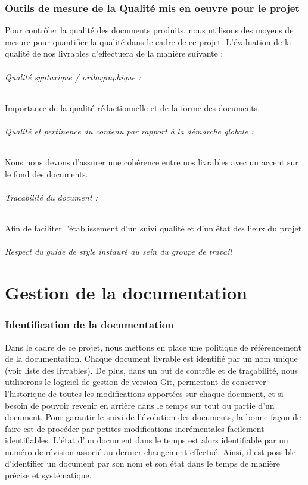 \documentclass[a4paper, 18pt]{article}
\begin{document}
\section{Outils de mesure de la Qualité mis en oeuvre pour le projet}

Pour contrôler la qualité des documents produits, nous utilisons des moyens de mesure pour quantifier la qualité dans le cadre de ce projet. L'évaluation de la qualité de nos livrables d'effectuera de la manière suivante :

\paragraph*{Qualité syntaxique / orthographique :} Importance de la qualité rédactionnelle et de la forme des documents.
\paragraph*{Qualité et pertinence du contenu par rapport à la démarche globale :} Nous nous devons d’assurer une cohérence entre nos livrables avec un accent sur le fond des documents.
\paragraph*{Tracabilité du document :} Afin de faciliter l’établissement d’un suivi qualité et d’un état des lieux du projet.
\paragraph*{Respect du guide de style instauré au sein du groupe de travail}

\part{Gestion de la documentation}

\section{Identification de la documentation}

Dans le cadre de ce projet, nous mettons en place une politique de référencement de la documentation. Chaque document livrable est identifié par un nom unique (voir liste des livrables). De plus, dans un but de contrôle et de traçabilité, nous utiliserons le logiciel de gestion de version Git, permettant de conserver l'historique de toutes les modifications apportées sur chaque document, et si besoin de pouvoir revenir en arrière dans le temps sur tout ou partie d'un document. Pour garantir le suivi de l'évolution des documents, la bonne façon de faire est de procéder par petites modifications incrémentales facilement identifiables. L'état d'un document dans le temps est alors identifiable par un numéro de révision associé au dernier changement effectué. Ainsi, il est possible d'identifier un document par son nom et son état dans le temps de manière précise et systématique.
\end{document}
